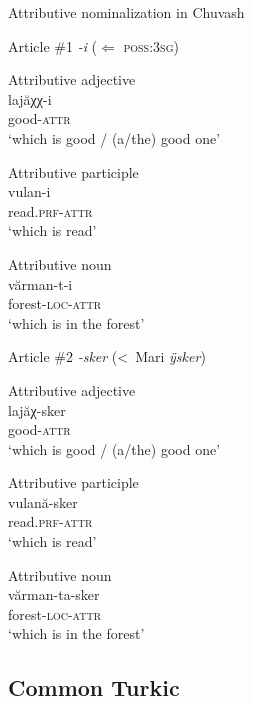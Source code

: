 \begin{exe}
\ex 
{\rm Attributive nominalization in Chuvash \citep{krueger1961}}
\begin{xlist}
\ex 
{\rm Article \#1 \textit{-i} ($\Leftarrow$ \textsc{poss:3sg})}
\begin{xlist}
\ex	
{\rm Attributive adjective}\\
\gll	lajăχχ-i\\
	good-\textsc{attr}\\
\glt	‘which is good / (a/the) good one’

\ex	
{\rm Attributive participle}\\
\gll	vulan-i\\
	read.\textsc{prf}-\textsc{attr}\\
\glt	‘which is read’

\ex	
{\rm Attributive noun}\\
\gll	vărman-t-i\\
	forest-\textsc{loc}-\textsc{attr}\\
\glt	‘which is in the forest’
\end{xlist}

\ex 
{\rm Article \#2 \textit{-sker} (<~Mari \textit{ÿsker})}
\begin{xlist}
\ex	
{\rm Attributive adjective}\\
\gll	lajăχ-sker\\
	good-\textsc{attr}\\
\glt	‘which is good / (a/the) good one’

\ex	
{\rm Attributive participle}\\
\gll	vulană-sker\\
	read.\textsc{prf}-\textsc{attr}\\
\glt	‘which is read’

\ex	
{\rm Attributive noun}\\
\gll	vărman-ta-sker\\
	forest-\textsc{loc}-\textsc{attr}\\
\glt	‘which is in the forest’
\end{xlist}
\end{xlist}
\end{exe}

\subsection{Common Turkic}
